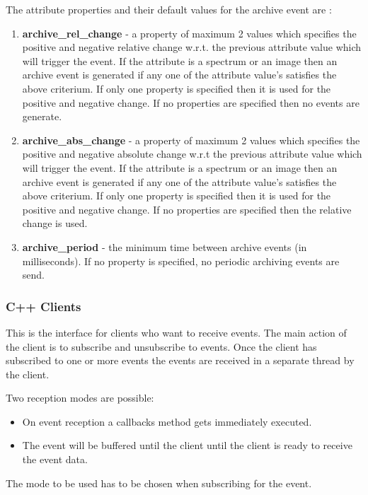The attribute properties and their default values for the \textquotedbl{}archive\textquotedbl{}
event are :
\begin{enumerate}
\item \textbf{archive\_rel\_change} - a property
of maximum 2 values which specifies the positive and negative relative
change w.r.t. the previous attribute value which will trigger the
event. If the attribute is a spectrum or an image then an archive
event is generated if any one of the attribute value's satisfies the
above criterium. If only one property is specified then it is used
for the positive and negative change. If no properties are specified
then no events are generate.
\item \textbf{archive\_abs\_change} - a property
of maximum 2 values which specifies the positive and negative absolute
change w.r.t the previous attribute value which will trigger the event.
If the attribute is a spectrum or an image then an archive event is
generated if any one of the attribute value's satisfies the above
criterium. If only one property is specified then it is used for the
positive and negative change. If no properties are specified then
the relative change is used.
\item \textbf{archive\_period} - the minimum time
between archive events (in milliseconds). If no property is specified,
no periodic archiving events are send.
\end{enumerate}

\subsubsection{C++ Clients}

This is the interface for clients who want to receive events.
The main action of the client is to subscribe and unsubscribe to events.
Once the client has subscribed to one or more events the events are
received in a separate thread by the client.

Two reception modes are possible:
\begin{itemize}
\item On event reception a callbacks method gets immediately executed.
\item The event will be buffered until the client until the client is ready
to receive the event data.
\end{itemize}
The mode to be used has to be chosen when subscribing for the event.


